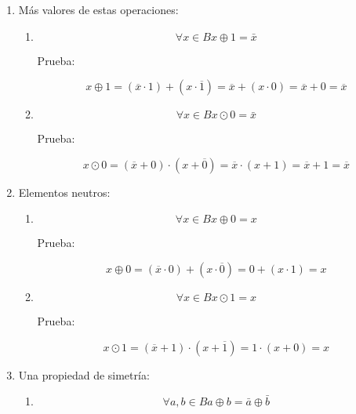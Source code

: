 \documentclass[
]{article}
\begin{document}
\begin{enumerate}
\begin{enumerate}
\begin{enumerate}
\begin{enumerate}
        Prueba:

        \[x \odot {{{{\overline{x} = {{({x + \overline{\overline{x}}})} \cdot {({\overline{x} + \overline{x}})}}} = {({{({x + x})} \cdot \overline{x}})}} = {x \cdot \overline{x}}} = 0}\]
      \end{enumerate}
    \item
      Más valores de estas operaciones:

      \begin{enumerate}
      \def\labelenumiv{\arabic{enumiv}.}
      \item
        \[\forall{x \in B}x \oplus {1 = \bar{x}}\]

        Prueba:

        \[x \oplus {{{{1 = {{({\overline{x} \cdot 1})} + {({x \cdot \overline{1}})}}} = {\overline{x} + {({x \cdot 0})}}} = {\overline{x} + 0}} = \overline{x}}\]
      \item
        \[\forall{x \in B}x \odot {0 = \bar{x}}\]

        Prueba:

        \[x \odot {{{{0 = {{({\overline{x} + 0})} \cdot {({x + \overline{0}})}}} = {\overline{x} \cdot {({x + 1})}}} = {\overline{x} + 1}} = \overline{x}}\]
      \end{enumerate}
    \item
      Elementos neutros:

      \begin{enumerate}
      \def\labelenumiv{\arabic{enumiv}.}
      \item
        \[\forall{x \in B}x \oplus {0 = x}\]

        Prueba:

        \[x \oplus {{{0 = {{({\overline{x} \cdot 0})} + {({x \cdot \overline{0}})}}} = {0 + {({x \cdot 1})}}} = x}\]
      \item
        \[\forall{x \in B}x \odot {1 = x}\]

        Prueba:

        \[x \odot {{{1 = {{({\overline{x} + 1})} \cdot {({x + \overline{1}})}}} = {1 \cdot {({x + 0})}}} = x}\]
      \end{enumerate}
    \item
      Una propiedad de simetría:

      \begin{enumerate}
      \def\labelenumiv{\arabic{enumiv}.}
      \item
        \[\forall a,{b \in B}a \oplus {b = \bar{a}} \oplus \bar{b}\]


\end{enumerate}
\end{enumerate}
\end{enumerate}
\end{enumerate}
\end{document}
